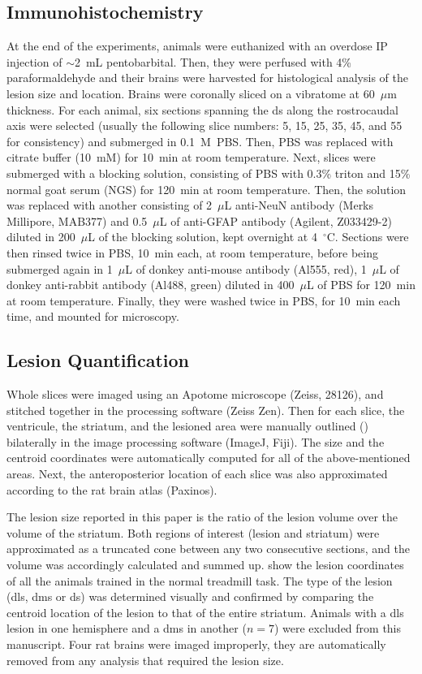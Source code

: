 \subsection{Immunohistochemistry}
At the end of the experiments, animals were euthanized with an overdose IP injection of $\sim$2~mL pentobarbital.
Then, they were perfused with 4\% paraformaldehyde and their brains were harvested for histological analysis of the lesion size and location.
Brains were coronally sliced on a vibratome at 60~$\mu$m thickness.
For each animal, six sections spanning the \gls{ds} along the rostrocaudal axis were selected (usually the following slice numbers: 5, 15, 25, 35, 45, and 55 for consistency) and submerged in 0.1~M~PBS.
Then, PBS was replaced with citrate buffer (10~mM) for 10~min at room temperature.
Next, slices were submerged with a blocking solution, consisting of PBS with 0.3\% triton and 15\% normal goat serum (NGS) for 120~min at room temperature.
Then, the solution was replaced with another consisting of 2~$\mu$L anti-NeuN antibody (Merks Millipore, MAB377) and 0.5~$\mu$L of anti-GFAP antibody (Agilent, Z033429-2) diluted in 200~$\mu$L of the blocking solution, kept overnight at 4~$^{\circ}$C.
Sections were then rinsed twice in PBS, 10~min each, at room temperature, before being submerged again in 1~$\mu$L of donkey anti-mouse antibody (Al555, red), 1~$\mu$L of donkey anti-rabbit antibody (Al488, green) diluted in 400~$\mu$L of PBS for 120~min at room temperature.
Finally, they were washed twice in PBS, for 10~min each time, and mounted for microscopy.

\subsection{Lesion Quantification}
Whole slices were imaged using an Apotome microscope (Zeiss, 28126), and stitched together in the processing software (Zeiss Zen).
Then for each slice, the ventricule, the striatum, and the lesioned area were manually outlined () bilaterally in the image processing software (ImageJ, Fiji).
The size and the centroid coordinates were automatically computed for all of the above-mentioned areas.
Next, the anteroposterior location of each slice was also approximated according to the rat brain atlas (Paxinos).
\par
The lesion size reported in this paper is the ratio of the lesion volume over the volume of the striatum.
Both regions of interest (lesion and striatum) were approximated as a truncated cone between any two consecutive sections, and the volume was accordingly calculated and summed up.
 show the lesion coordinates of all the animals trained in the normal treadmill task.
The type of the lesion (\gls{dls}, \gls{dms} or \gls{ds}) was determined visually and confirmed by comparing the centroid location of the lesion to that of the entire striatum.
Animals with a \gls{dls} lesion in one hemisphere and a \gls{dms} in another ($n=7$) were excluded from this manuscript.
Four rat brains were imaged improperly, they are automatically removed from any analysis that required the lesion size.


